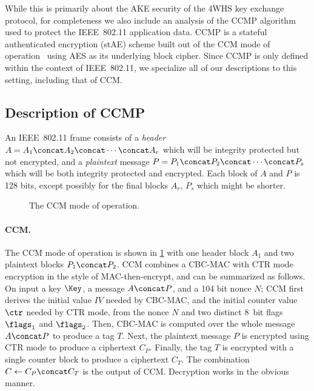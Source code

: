 While this  is primarily about the AKE security of the 4WHS key exchange protocol,
for completeness we also include an analysis of the CCMP algorithm used to protect the IEEE~802.11 application data.
CCMP is a stateful authenticated encryption (stAE) scheme built out of the CCM mode of operation~\cite{IETF:RFC3610:CCM} using AES as its underlying block cipher.
Since CCMP is only defined within the context of IEEE~802.11,
we specialize all of our descriptions to this setting,
including that of CCM.





\subsection{Description of CCMP}



An IEEE~802.11 frame consists of a \emph{header} $A = A_1 \concat A_2 \concat \dotsb \concat A_r$ which will be integrity protected but not encrypted,
and a \emph{plaintext} message $P = P_1 \concat P_2 \concat \dotsb \concat P_s$ which will be both integrity protected and encrypted.
Each block of $A$ and $P$ is 128 bits,
except possibly for the final blocks $A_r$, $P_s$ which might be shorter.

\begin{figure}
	\centerline{
		\hspace{-0.7em}
	}
	
	\caption{The CCM mode of operation.}
	\label{fig:CCM}
\end{figure}


\paragraph{CCM.}
The CCM mode of operation is shown in \cref{fig:CCM} with one header block $A_1$ and two plaintext blocks $P_1 \concat P_2$.
CCM combines a CBC-MAC with CTR mode encryption in the style of MAC-then-encrypt,
and can be summarized as follows.
On input a key $\Key$,
a message $A \concat P$,
and a 104 bit nonce $N$;
CCM first derives the initial value $IV$ needed by CBC-MAC, and the initial counter value $\ctr$ needed by CTR mode,
from the nonce $N$ and two distinct 8~bit flags $\flags_1$ and $\flags_2$.
Then, CBC-MAC is computed over the whole message $A \concat P$ to produce a tag $T$.
Next, the plaintext message $P$ is encrypted using CTR mode to produce a ciphertext $C_P$.
Finally,
the tag $T$ is encrypted with a single counter block to produce a ciphertext $C_T$.
The combination $C \gets C_P \concat C_T$ is the output of CCM.
Decryption works in the obvious manner.

